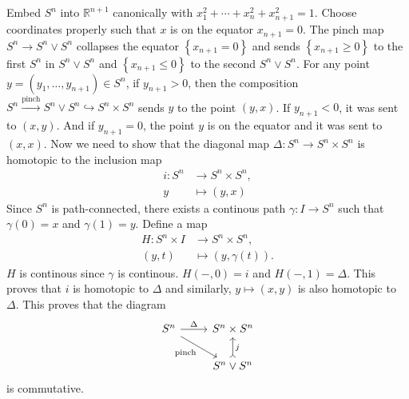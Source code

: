 \documentclass[a4paper, 12pt]{article}
\begin{document}
\begin{solution}
Embed \(S^n\) into \(\mathbb{R}^{n+1}\) canonically with \(x_1^2+\cdots+x_n^2+x_{n+1}^2=1\). Choose coordinates properly such that \(x\) is on the equator \(x_{n+1}=0\). The pinch map \(S^n\rightarrow S^n\vee S^n\) collapses the equator \(\left\{ x_{n+1}=0 \right\}\) and 
sends \(\left\{ x_{n+1}\geq 0 \right\}\) to the first \(S^n\) in \(S^n\vee S^n\) and \(\left\{ x_{n+1}\leq 0 \right\}\) to the second \(S^n\vee S^n\). For any point \(y=(y_1,\ldots,y_{n+1})\in S^n\), if \(y_{n+1}>0\), then the composition 
\(S^n\xrightarrow{\text{pinch}}S^n\vee S^n\hookrightarrow S^n\times S^n\) sends \(y\) to the point \((y,x)\). If \(y_{n+1}<0\), it was sent to \((x,y)\). And if \(y_{n+1}=0\), the point \(y\) is on the equator and it was sent to 
\((x,x)\). Now we need to show that the diagonal map \(\Delta:S^n\rightarrow S^n\times S^n\) is homotopic to the inclusion map 
\begin{align*}
	i:S^n&\rightarrow S^n\times S^n,\\
	  y&\mapsto (y,x) 
\end{align*}
Since \(S^n\) is path-connected, there exists a continous path \(\gamma:I\rightarrow S^n\) such that \(\gamma(0)=x\) and \(\gamma(1)=y\). Define a map 
\begin{align*}
	H:S^n\times I&\rightarrow S^n\times S^n,\\ 
      (y,t)&\mapsto (y,\gamma(t)).
\end{align*}
\(H\) is continous since \(\gamma\) is continous. \(H(-,0)=i\) and \(H(-,1)=\Delta\). This proves that \(i\) is homotopic to \(\Delta\) and similarly, \(y\mapsto (x,y)\) is also homotopic to \(\Delta\). This proves that the diagram 
\[\begin{tikzcd}
	{S^n} & {S^n\times S^n} \\
	& {S^n\vee S^n}
	\arrow["\Delta", from=1-1, to=1-2]
	\arrow["{\text{pinch}}"', from=1-1, to=2-2]
	\arrow["j"', tail, from=2-2, to=1-2]
\end{tikzcd}\]
is commutative.
\end{solution}
\end{document}
